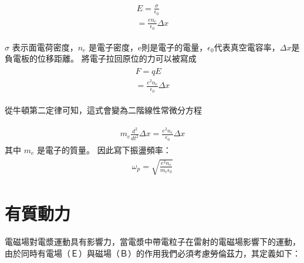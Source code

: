 \begin{align}
  \begin{split}
    E = \frac{\sigma}{\epsilon_{0}}
    \\
    = \frac{en_{e}}{\epsilon_{0}} \Delta x
  \end{split}
\end{align}

\(\sigma\) 表示面電荷密度，\(n_{e}\) 是電子密度，e則是電子的電量，\(\epsilon_{0}\)代表真空電容率，\(\Delta x\)是負電板的位移距離。
將電子拉回原位的力可以被寫成
\begin{align}
  \begin{split}
    F = qE
    \\
    = \frac{e^{2}n_{e}}{\epsilon_{0}} \Delta x
  \end{split}
\end{align}

從牛頓第二定律可知，這式會變為二階線性常微分方程

\begin{align}
  \begin{split}
    m_{e}\frac{d^2}{dt^2}\Delta x = \frac{e^{2}n_{e}}{\epsilon_{0}} \Delta x
  \end{split}
\end{align}
其中 \(m_{e}\) 是電子的質量。 因此寫下振盪頻率：
\begin{align}
  \begin{split}
    \omega_{p} = \sqrt{\frac{e^{2}n_{e}}{m_{e}\epsilon_{0}}}
  \end{split}
\end{align}

\section{有質動力}%
電磁場對電漿運動具有影響力，當電漿中帶電粒子在雷射的電磁場影響下的運動，由於同時有電場（Ｅ）與磁場（Ｂ）的作用我們必須考慮勞倫茲力，其定義如下：


